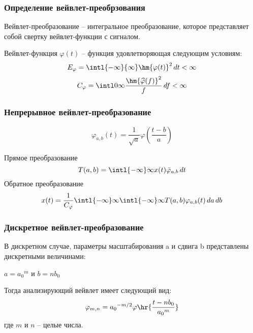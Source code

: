 \documentclass[a4paper]{article}
\begin{document}
\subsubsection{Определение вейвлет-преобрзования}
\begin{df}
  Вейвлет-преобразование -- интегральное преобразование, которое
  представляет собой свертку вейвлет-функции с сигналом.
\end{df}
\begin{df}
  Вейвлет-функция $\varphi(t)$ -- функция удовлетворяющая следующим условиям:
    \begin{equation*}
      E_\varphi = \intl{-\infty}{\infty}\hm{\varphi(t)}^2\,dt < \infty 
    \end{equation*}
    \begin{equation*}
      C_\varphi = \intl0\infty \frac{\hm{\widehat\varphi(f)}^2}{f}\,df <\infty
    \end{equation*}
\end{df}
\subsubsection{Непрерывное вейвлет-преобразование}
\begin{denote}
  \begin{equation*}
    \varphi_{a,b}(t) =\frac1{\sqrt a} \varphi(\frac{t-b}{a})
  \end{equation*}
\end{denote}
Прямое преобразование
\begin{equation*}
  \displaystyle
  T(a,b) = \intl{-\infty}\infty x(t) \bar\varphi_{a,b}\,dt
\end{equation*}
Обратное преобразование 
\begin{equation*}
  \displaystyle
  x(t) = \frac1{C_\varphi}\intl{-\infty}\infty\intl{-\infty}\infty T(a,b)\varphi_{a,b}(t)\,da\,db
\end{equation*}
\subsubsection{Дискретное вейвлет-преобразование}
В дискретном случае, параметры масштабирования a и сдвига b
представлены дискретными величинами:

$ a = {a_0}^m $ и $ b = n {b_0} $

Тогда анализирующий вейвлет имеет следующий вид:
\begin{displaymath}
 \varphi_{m,n} = {a_0}^{-m/2} {\varphi}\hr{\frac{t - n b_0}{{a_0}^m}} 
\end{displaymath}
где $m$ и $n$ -- целые числа.
\end{document}
